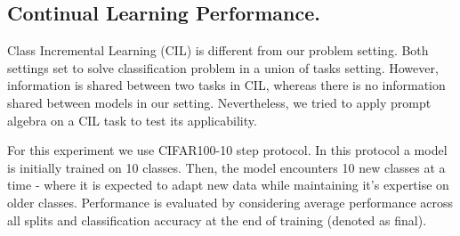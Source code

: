 \documentclass[10pt,twocolumn,letterpaper]{article}
\begin{document}
\begin{table}[]
\centering
\caption{Continual learning results on CIFAR100 Dataset}
\label{tbl:cil}
\end{table}


\subsection{Continual Learning Performance.} Class Incremental Learning (CIL) is different from our problem setting. Both settings set to solve classification problem in a union of tasks setting. However, information is shared between two tasks in CIL, whereas there is no information shared between models in our setting. Nevertheless, we tried to apply prompt algebra on a CIL task to test its applicability. 


For this experiment we use CIFAR100-10 step protocol. In this protocol a model is initially trained on 10 classes. Then, the model encounters 10 new classes at a time - where it is expected to adapt new data while maintaining it's expertise on older classes. Performance is evaluated by considering average performance across all splits and classification accuracy at the end of training (denoted as final).
\end{document}
